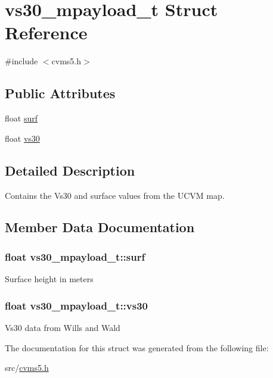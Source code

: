 \hypertarget{structvs30__mpayload__t}{\section{vs30\+\_\+mpayload\+\_\+t Struct Reference}
\label{structvs30__mpayload__t}
}


{\ttfamily \#include $<$cvms5.\+h$>$}

\subsection*{Public Attributes}
\begin{DoxyCompactItemize}
\item 
float \hyperlink{structvs30__mpayload__t_a31d03d6028d693fa37dd347dd5b3d94b}{surf}
\item 
float \hyperlink{structvs30__mpayload__t_a6248e73384da65d55d57e1b2df1d4eb6}{vs30}
\end{DoxyCompactItemize}


\subsection{Detailed Description}
Contains the Vs30 and surface values from the U\+C\+V\+M map. 

\subsection{Member Data Documentation}
\hypertarget{structvs30__mpayload__t_a31d03d6028d693fa37dd347dd5b3d94b}{
\subsubsection[{surf}]{\setlength{\rightskip}{0pt plus 5cm}float vs30\+\_\+mpayload\+\_\+t\+::surf}}\label{structvs30__mpayload__t_a31d03d6028d693fa37dd347dd5b3d94b}
Surface height in meters \hypertarget{structvs30__mpayload__t_a6248e73384da65d55d57e1b2df1d4eb6}{
\subsubsection[{vs30}]{\setlength{\rightskip}{0pt plus 5cm}float vs30\+\_\+mpayload\+\_\+t\+::vs30}}\label{structvs30__mpayload__t_a6248e73384da65d55d57e1b2df1d4eb6}
Vs30 data from Wills and Wald 

The documentation for this struct was generated from the following file\+:\begin{DoxyCompactItemize}
\item 
src/\hyperlink{cvms5_8h}{cvms5.\+h}\end{DoxyCompactItemize}
